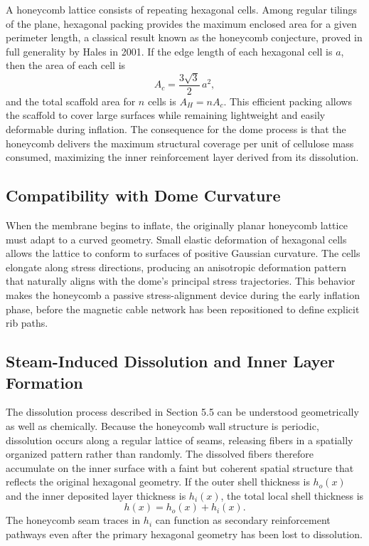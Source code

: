 \documentclass[12pt,a4paper]{article}
\begin{document}
A honeycomb lattice consists of repeating hexagonal cells. Among
regular tilings of the plane, hexagonal packing provides the maximum
enclosed area for a given perimeter length, a classical result known as
the honeycomb conjecture, proved in full generality by Hales in 2001.
If the edge length of each hexagonal cell is $a$, then the area of each
cell is
\begin{equation}
A_c = \frac{3\sqrt{3}}{2}\, a^2,
\end{equation}
and the total scaffold area for $n$ cells is $A_H = n A_c$. This
efficient packing allows the scaffold to cover large surfaces while
remaining lightweight and easily deformable during inflation. The
consequence for the dome process is that the honeycomb delivers the
maximum structural coverage per unit of cellulose mass consumed,
maximizing the inner reinforcement layer derived from its dissolution.

\subsection{Compatibility with Dome Curvature}

When the membrane begins to inflate, the originally planar honeycomb
lattice must adapt to a curved geometry. Small elastic deformation of
hexagonal cells allows the lattice to conform to surfaces of positive
Gaussian curvature. The cells elongate along stress directions, producing
an anisotropic deformation pattern that naturally aligns with the
dome's principal stress trajectories. This behavior makes the honeycomb
a passive stress-alignment device during the early inflation phase,
before the magnetic cable network has been repositioned to define
explicit rib paths.

\subsection{Steam-Induced Dissolution and Inner Layer Formation}

The dissolution process described in Section 5.5 can be understood
geometrically as well as chemically. Because the honeycomb wall
structure is periodic, dissolution occurs along a regular lattice of
seams, releasing fibers in a spatially organized pattern rather than
randomly. The dissolved fibers therefore accumulate on the inner surface
with a faint but coherent spatial structure that reflects the original
hexagonal geometry. If the outer shell thickness is $h_o(x)$ and the
inner deposited layer thickness is $h_i(x)$, the total local shell
thickness is
\begin{equation}
h(x) = h_o(x) + h_i(x).
\end{equation}
The honeycomb seam traces in $h_i$ can function as secondary
reinforcement pathways even after the primary hexagonal geometry has
been lost to dissolution.
\end{document}
